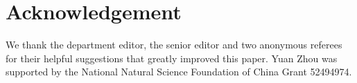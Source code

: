 \documentclass[opre]{informs3aa}
\begin{document}

\section*{Acknowledgement}
We thank the department editor, the senior editor and two anonymous referees for their helpful suggestions that greatly improved this paper.
Yuan Zhou was supported by the National Natural Science Foundation of China Grant 52494974.
\end{document}

